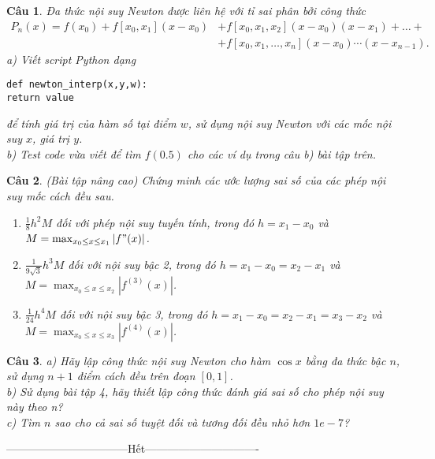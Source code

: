 \documentclass[11pt]{article}
\newtheorem{bt}{Câu}
\begin{document}
\begin{bt}
Đa thức nội suy Newton được liên hệ với tỉ sai phân bởi công thức
%
\begin{align*}
P_n(x) = f(x_0)+f[x_0,x_1](x-x_0) &+f[x_0,x_1,x_2](x-x_0)(x-x_1)+ \dots + \\ 
&+ f[x_0,x_1,\dots,x_n](x-x_0)\cdots(x-x_{n-1}).
\end{align*}
%
a) Viết script Python dạng 
%
\begin{lstlisting}[frame=single] 
def newton_interp(x,y,w):
return value
\end{lstlisting}
%
để tính giá trị của hàm số tại điểm $w$, sử dụng nội suy Newton với các mốc nội suy $x$, giá trị $y$. \\	
b) Test code vừa viết để tìm $f(0.5)$ cho các ví dụ trong câu b) bài tập trên. 
\end{bt}

\begin{bt}(Bài tập nâng cao) Chứng minh các ước lượng sai số của các phép nội suy mốc cách đều sau.
\begin{enumerate}
\item[a)]  $\frac{1}{8}h^2M$ đối với phép nội suy tuyến tính, trong đó $h = x_1-x_0$ và $M = \max_{x_0 \leq x \leq x_1} |f"(x)|$. 
\item[b)] $\frac{1}{9\sqrt{3}}h^3M$ đối với nội suy bậc 2, trong đó $h = x_1-x_0 = x_2-x_1$ và $M = \max_{x_0 \leq x \leq x_2} |f^{(3)}(x)|$. 
\item[c)] $\frac{1}{24} h^4M$ đối với nội suy bậc 3, trong đó $h = x_1-x_0 = x_2-x_1= x_3-x_2$ và $M = \max_{x_0 \leq x \leq x_3} |f^{(4)}(x)|$.
\end{enumerate}	
\end{bt}

\begin{bt} 
	a) Hãy lập công thức nội suy Newton cho hàm $\cos x$ bằng đa thức bậc $n$, sử dụng $n+1$ điểm cách đều trên đoạn $[0, 1]$. \\
	b) Sử dụng bài tập 4, hãy thiết lập công thức đánh giá sai số cho phép nội suy này theo n? \\ c) Tìm $n$ sao cho cả sai số tuyệt đối và tương đối đều nhỏ hơn $1e-7$?	
\end{bt}

\centerline{———————————Hết——————————-}
\end{document}
